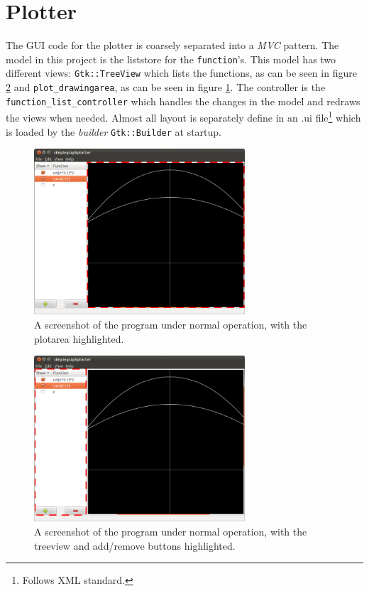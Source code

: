 \documentclass[a4paper,11pt]{kth-mag}
\begin{document}
\section{Plotter}
The GUI code for the plotter is coarsely separated into a \emph{MVC} pattern. 
The model in this project is the liststore for the \texttt{function}'s. This model 
has two different views: \texttt{Gtk::TreeView} which lists the functions, as can be seen
in figure \ref{fig:screenshotfunctionlistcontroller} and
\texttt{plot\_drawingarea}, as can be seen in figure
\ref{fig:screenshotplotarea}.
The controller is the \texttt{function\_list\_controller} which handles the
changes in the model and redraws the views when needed.
Almost all layout is separately define in an .ui file\footnote{Follows XML
standard.} which is loaded by the \emph{builder} \texttt{Gtk::Builder} at startup.

\begin{figure}[H]
\begin{center}
    \includegraphics[width=0.7\textwidth]{screenshot00_plotarea.png}
    \caption{\small{A screenshot of the program under normal operation, with
    the plotarea highlighted.}}
   \label{fig:screenshotplotarea}
\end{center}
\end{figure}
\begin{figure}[H]
\begin{center}
    \includegraphics[width=0.7\textwidth]{screenshot00_function_list_controller.png}
    \caption{\small{A screenshot of the program under normal operation, with
    the treeview and add/remove buttons highlighted.}}
   \label{fig:screenshotfunctionlistcontroller}
\end{center}
\end{figure}
\end{document}

